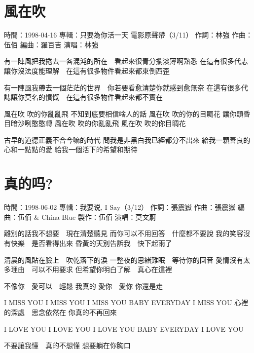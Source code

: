 \documentclass[UTF8,a4paper,oneside,twocolumn,12pt]{ctexbook}
\newcommand{\infopair}[2]{\textbullet #1：#2}
\newcommand{\zc}[1][伍佰]{\infopair{作詞}{#1}}
\newcommand{\zq}[1][伍佰]{\infopair{作曲}{#1}}
\newcommand{\bq}[1][伍佰]{\infopair{編曲}{#1}}
\newcommand{\zj}[1]{\infopair{專輯}{#1}}
\newcommand{\zz}[1]{\infopair{製作}{#1}}
\newcommand{\sj}[1]{\infopair{時間}{#1}}
\newenvironment{info}{\begin{flushleft}\kaishu
	}
	{\end{flushleft}\normalsize\yahei\par}
\newenvironment{lyric}{
	}
{}
\begin{document}
\section{風在吹}
\begin{info}
	\sj{1998-04-16}
	\zj{只要為你活一天 電影原聲帶（3/11）}
	\zc[林強]
	\zq
	\bq[羅百吉]
	\infopair{演唱}{林強}
\end{info}
\begin{lyric}
	有一陣風把我捲去一各混沌的所在　看起來很青分擱淡薄啊熟悉
	在這有很多代志讓你沒法度能理解　在這有很多物件看起來都東倒西歪

	有一陣風我帶去一個茫茫的世界　你若要看愈清楚你就感到愈無奈
	在這有很多代誌讓你莫名的憤慨　在這有很多物件看起來都不實在


	風在吹 吹的你亂亂飛 不知到底要相信啥人的話
	風在吹 吹的你的目睭花 讓你頭昏目暗沙咧憨憨轉
	風在吹 吹的你亂亂飛
	風在吹 吹的你目睭花

	古早的道德正義不合今嘛的時代
	問我是非黑白我已經都分不出來
	給我一顆善良的心和一點點的愛
	給我一個活下的希望和期待
\end{lyric}

\section{真的吗?}
\begin{info}
	\sj{1998-06-02}
	\zj{我要说, I Say（3/12）}
	\zc[張震嶽]
	\zq[張震嶽]
	\bq[伍佰 \& China Blue]
	\zz{伍佰}
	\infopair{演唱}{莫文蔚}
\end{info}
\begin{lyric}
	離別的話我不想要　現在清楚聽見
	而你可以不用回答　什麼都不要說
	我的笑容沒有快樂　是否看得出來
	昏黃的天別告訴我　快下起雨了

	清晨的風貼在臉上　吹乾落下的淚
	一整夜的思緒難眠　等待你的回音
	愛情沒有太多理由　可以不用要求
	但希望你明白了解　真心在這裡

	不像你　愛可以　輕鬆  我真的
	愛你　愛你  你還是走

	I MISS YOU  I MISS YOU  I MISS YOU
	BABY EVERYDAY I MISS YOU
	心裡的深處　思念依然在  你真的不再回來

	I LOVE YOU  I LOVE YOU  I LOVE YOU
	BABY EVERYDAY I LOVE YOU

	不要讓我懂　真的不想懂  想要躺在你胸口
\end{lyric}
\end{document}
